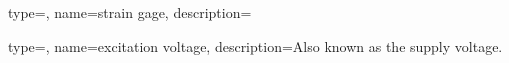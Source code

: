 {
type=\thisgls,
name={strain gage},
description={}
}

{
type=\thisgls,
name={excitation voltage},
description={Also known as the supply voltage.}
}


